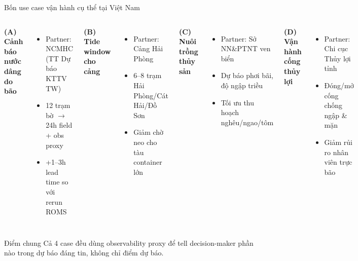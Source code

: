 \documentclass[11pt,aspectratio=169]{beamer}
\begin{document}
\begin{frame}{Bốn use case vận hành cụ thể tại Việt Nam}
  \small
  \begin{columns}[T]
      \textbf{(A) Cảnh báo nước dâng do bão}
      \begin{itemize}\itemsep0pt
        \item Partner: \alert{NCMHC} (TT Dự báo KTTV TW)
        \item 12 trạm bờ $\to$ 24h field + obs proxy
        \item +1--3h lead time so với rerun ROMS
      \end{itemize}

      \vspace{6pt}
      \textbf{(B) Tide window cho cảng}
      \begin{itemize}\itemsep0pt
        \item Partner: \alert{Cảng Hải Phòng}
        \item 6--8 trạm Hải Phòng/Cát Hải/Đồ Sơn
        \item Giảm chờ neo cho tàu container lớn
      \end{itemize}

      \textbf{(C) Nuôi trồng thủy sản}
      \begin{itemize}\itemsep0pt
        \item Partner: \alert{Sở NN\&PTNT} ven biển
        \item Dự báo phơi bãi, độ ngập triều
        \item Tối ưu thu hoạch nghêu/ngao/tôm
      \end{itemize}

      \vspace{6pt}
      \textbf{(D) Vận hành cống thủy lợi}
      \begin{itemize}\itemsep0pt
        \item Partner: \alert{Chi cục Thủy lợi tỉnh}
        \item Đóng/mở cống chống ngập \& mặn
        \item Giảm rủi ro nhân viên trực bão
      \end{itemize}
  \end{columns}

  \vspace{8pt}
  \begin{block}{Điểm chung}
    Cả 4 case đều dùng \alert{observability proxy} để tell decision-maker
    \alert{phần nào trong dự báo đáng tin}, không chỉ điểm dự báo.
  \end{block}
\end{frame}
\end{document}
